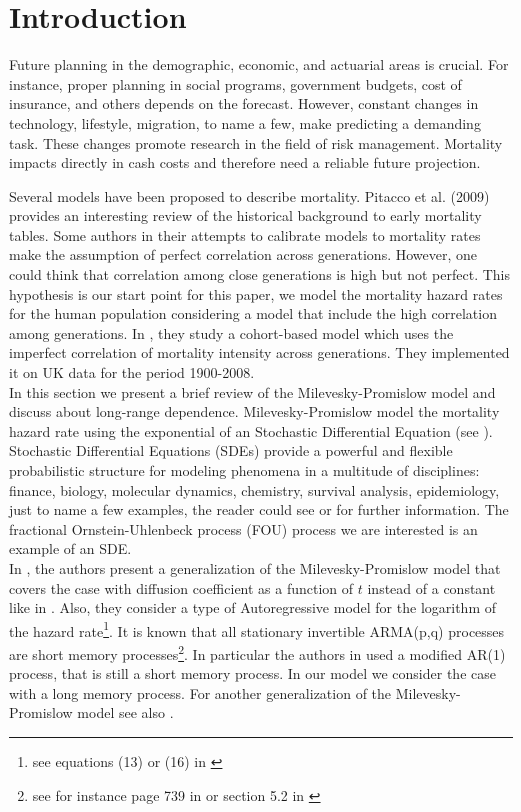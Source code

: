 \documentclass[smallextended]{svjour3}
\begin{document}
\section{Introduction}
\label{intro}

        Future planning in the demographic, economic, and actuarial areas is
    crucial. For instance, proper planning in social programs, government
    budgets, cost of insurance, and others depends on the forecast. However,
    constant changes in technology, lifestyle, migration, to name a few, make
    predicting a demanding task. These changes promote research in the field of
    risk management. Mortality impacts directly in cash costs and therefore
    need a reliable future projection.


Several models have been proposed to describe mortality. Pitacco et al. (2009)
provides an interesting review of the
historical background to early mortality tables. Some authors in their attempts
to calibrate models to mortality rates
make the assumption of perfect correlation across generations. However, one
could think that correlation among close generations is
high but not perfect. This hypothesis is
our start point for this paper, we model the mortality hazard rates for the
human population considering a
model that include the high correlation among generations.
In \cite{je-lu-vi}, they study a cohort-based model which uses the imperfect
correlation of mortality intensity
across generations. They implemented  it on UK data for the period 1900-2008.\\


In this section we present a brief review of the Milevesky-Promislow model and
discuss about long-range dependence.
Milevesky-Promislow model the mortality hazard rate using the
exponential of an Stochastic Differential Equation (see \cite{mi-pr}).  \\

Stochastic Differential Equations (SDEs) provide a powerful and flexible
probabilistic structure for modeling phenomena in a
multitude of disciplines: finance, biology, molecular dynamics, chemistry,
survival analysis, epidemiology, just to name a few
examples, the reader could see \cite{ok} or \cite{kl-pl} for further
information. The fractional Ornstein-Uhlenbeck process
(FOU) process we are interested is an example of an SDE.\\


In \cite{gi-or-be}, the authors present a generalization of the
Milevesky-Promislow model that covers the case with diffusion
coefficient as a function of $t$ instead of  a constant like in \cite{mi-pr}.
Also, they consider a type of Autoregressive model
for the logarithm of the hazard rate\footnote{see equations (13) or (16) in
\cite{gi-or-be}}. It is known that all stationary invertible
ARMA(p,q) processes are short memory processes\footnote{see for instance page
739 in \cite{be-ye-fe-gh} or section 5.2
    in \cite{sh-st}}.
In particular the authors in  \cite{gi-or-be} used a modified AR(1) process,
that is still a
short memory process. In our model we consider the case  with a long memory
process. For another generalization of the Milevesky-Promislow model see also
\cite{ro-le}. \\
\end{document}
